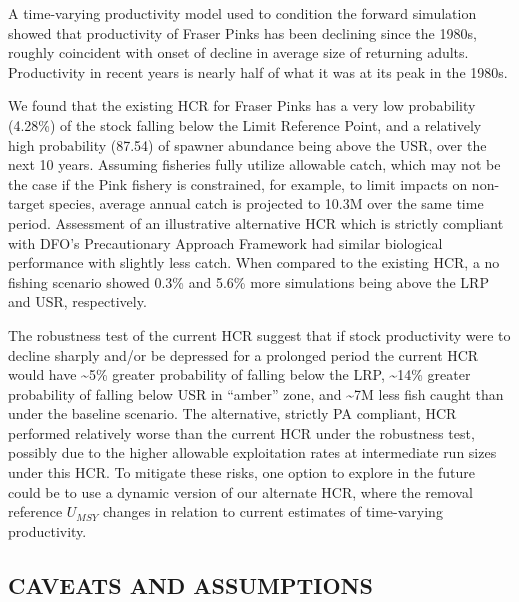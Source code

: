 \documentclass[11pt]{book}
\begin{document}
A time-varying productivity model used to condition the forward simulation showed that productivity of Fraser Pinks has been declining since the 1980s, roughly coincident with onset of decline in average size of returning adults. Productivity in recent years is nearly half of what it was at its peak in the 1980s.

We found that the existing HCR for Fraser Pinks has a very low probability (4.28\%) of the stock falling below the Limit Reference Point, and a relatively high probability (87.54) of spawner abundance being above the USR, over the next 10 years. Assuming fisheries fully utilize allowable catch, which may not be the case if the Pink fishery is constrained, for example, to limit impacts on non-target species, average annual catch is projected to 10.3M over the same time period. Assessment of an illustrative alternative HCR which is strictly compliant with DFO's Precautionary Approach Framework had similar biological performance with slightly less catch. When compared to the existing HCR, a no fishing scenario showed 0.3\% and 5.6\% more simulations being above the LRP and USR, respectively.

The robustness test of the current HCR suggest that if stock productivity were to decline sharply and/or be depressed for a prolonged period the current HCR would have \textasciitilde5\% greater probability of falling below the LRP, \textasciitilde14\% greater probability of falling below USR in ``amber'' zone, and \textasciitilde7M less fish caught than under the baseline scenario. The alternative, strictly PA compliant, HCR performed relatively worse than the current HCR under the robustness test, possibly due to the higher allowable exploitation rates at intermediate run sizes under this HCR. To mitigate these risks, one option to explore in the future could be to use a dynamic version of our alternate HCR, where the removal reference \(U_{MSY}\) changes in relation to current estimates of time-varying productivity.

\hypertarget{caveats-and-assumptions}{%
\subsection{CAVEATS AND ASSUMPTIONS}\label{caveats-and-assumptions}}
\end{document}
